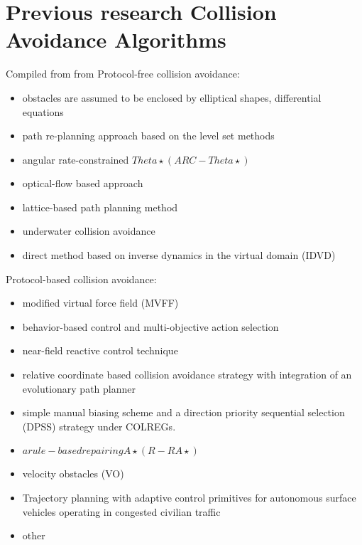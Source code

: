 \section{Previous research Collision Avoidance Algorithms}
Compiled from from \cite{liu2016unmanned}
Protocol-free collision avoidance:
\begin{itemize}
    \item obstacles are assumed to be enclosed by elliptical shapes, differential equations \cite{soltan2009trajectory}
    \item path re-planning approach based on the level set methods \cite{xu2013fast}
    \item angular rate-constrained $ Theta\star ( ARC - Theta\star ) $ \cite{kim2014angular}
    \item optical-flow based approach \cite{el2013visual}
    \item lattice-based path planning method \cite{bertaska2013experimental}
    \item underwater collision avoidance\cite{heidarsson2011obstacle,onunka2013probabilistic}
    \item direct method based on inverse dynamics in the virtual domain (IDVD) \cite{yakimenko2011real}
    
\end{itemize}
Protocol-based collision avoidance:
\begin{itemize}
    \item modified virtual force field (MVFF) \cite{lee2004fuzzy}
    \item behavior-based control and multi-objective action selection \cite{benjamin2004colregs,benjamin2006method}
    \item near-field reactive control technique \cite{larson2007advances}
    \item relative coordinate based collision avoidance strategy with integration of an evolutionary path planner \cite{zhuang2011motion}
    \item simple manual biasing scheme and a direction priority sequential selection (DPSS) strategy under COLREGs. \cite{naeem2012colregs}
    \item $ a rule-based repairing A\star ( R - RA\star ) $ \cite{campbell2014automatic}
    \item velocity obstacles (VO) \cite{kuwata2014safe}
    \item Trajectory planning with adaptive control primitives
    for autonomous surface vehicles operating in congested civilian traffic \cite{shah2014trajectory}
    \item other  \cite{svec2013dynamics,vsvec2016adaptive,svec2012automated,svec2012usv}
    
\end{itemize}
 
